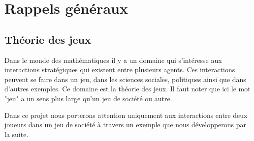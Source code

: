 \documentclass[a4paper, 12pt, french]{article}
\begin{document}
	\section{Rappels généraux}
	\subsection{Théorie des jeux}
	Dans le monde des mathématiques il y a un domaine qui s'intéresse aux interactions stratégiques qui existent
	entre plusieurs agents. Ces interactions peuvent se faire dans un jeu, dans les sciences sociales, politiques
	ainsi que dans d'autres exemples. Ce domaine est la théorie des jeux\cite{wiki_theorie_jeux}.
	Il faut noter que ici le mot "jeu" a un sens plus large qu'un jeu de société ou autre.

	Dans ce projet nous porterons attention uniquement aux interactions entre deux joueurs dans un jeu de société à
	travers un exemple que nous développerons par la suite.
\end{document}
